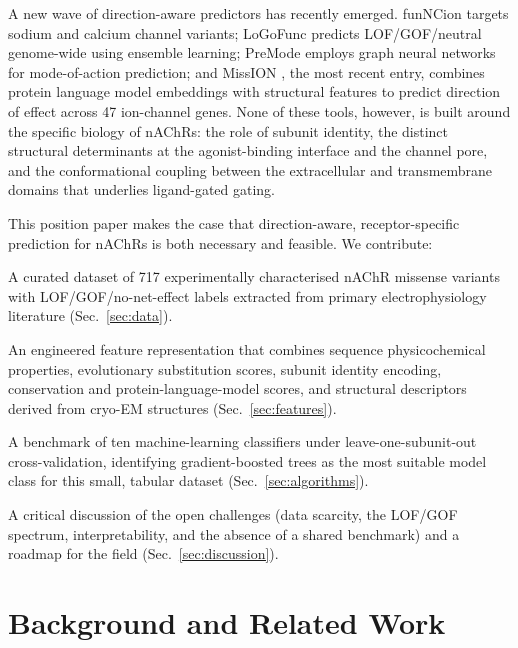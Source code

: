 \documentclass{ws-procs11x85}
\begin{document}
A new wave of direction-aware predictors has recently emerged.
funNCion \cite{funncion} targets sodium and calcium channel variants;
LoGoFunc \cite{logofunc} predicts LOF/GOF/neutral genome-wide using
ensemble learning; PreMode \cite{premode} employs graph neural networks
for mode-of-action prediction; and MissION \cite{mission}, the most
recent entry, combines protein language model embeddings with structural
features to predict direction of effect across 47 ion-channel genes.
None of these tools, however, is built around the specific biology of
nAChRs: the role of subunit identity, the distinct structural
determinants at the agonist-binding interface and the channel pore,
and the conformational coupling between the extracellular and
transmembrane domains that underlies ligand-gated gating.

This position paper makes the case that direction-aware, receptor-specific
prediction for nAChRs is both necessary and feasible. We contribute:
\begin{itemlist}
\item A curated dataset of 717 experimentally characterised nAChR
  missense variants with LOF/GOF/no-net-effect labels extracted from
  primary electrophysiology literature (Sec.~\ref{sec:data}).
\item An engineered feature representation that combines sequence
  physicochemical properties, evolutionary substitution scores, subunit
  identity encoding, conservation and protein-language-model scores, and
  structural descriptors derived from cryo-EM structures
  (Sec.~\ref{sec:features}).
\item A benchmark of ten machine-learning classifiers under
  leave-one-subunit-out cross-validation, identifying gradient-boosted
  trees as the most suitable model class for this small, tabular dataset
  (Sec.~\ref{sec:algorithms}).
\item A critical discussion of the open challenges (data scarcity,
  the LOF/GOF spectrum, interpretability, and the absence of a shared
  benchmark) and a roadmap for the field (Sec.~\ref{sec:discussion}).
\end{itemlist}

\section{Background and Related Work}\label{sec:background}
\end{document}
